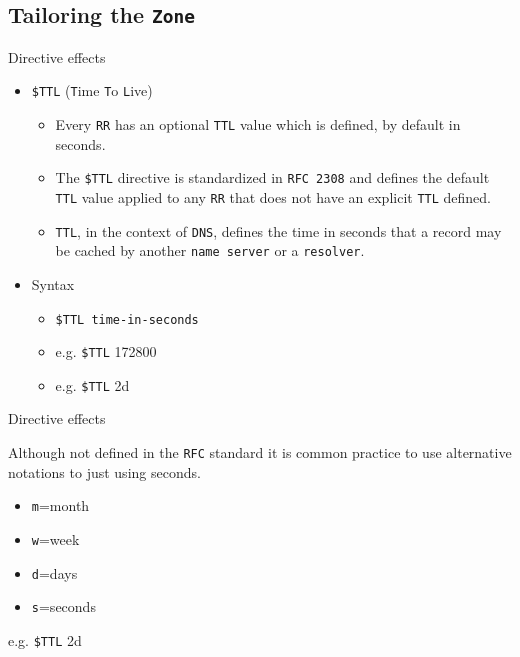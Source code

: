 \documentclass[xcolor=table]{beamer}
\begin{document}
\subsection{Tailoring the \texttt{Zone}}
\begin{frame}{Directive effects}
  \begin{itemize}
    \item \texttt{\$TTL} (\texttt{T}ime \texttt{T}o \texttt{L}ive)
       \begin{itemize}
          \item Every \texttt{RR} has an optional \texttt{TTL} value which is defined, by default in seconds.
          \item The \texttt{\$TTL} directive is standardized in \texttt{RFC 2308} and defines the default \texttt{TTL} value applied to any \texttt{RR} that does not have an explicit \texttt{TTL} defined. 
          \item \texttt{TTL}, in the context of \texttt{DNS}, defines the time in seconds that a record may be cached by another \texttt{name server} or a \texttt{resolver}.
       \end{itemize}
    \item Syntax
       \begin{itemize}
          \item \texttt{\$TTL time-in-seconds}
          \item e.g. \texttt{\$TTL} 172800
          \item e.g. \texttt{\$TTL} 2d
       \end{itemize}
  \end{itemize}
\end{frame}

\begin{frame}{Directive effects}
  \begin{tcolorbox}[title={\textbf{NOTE:}}]
    Although not defined in the \texttt{RFC} standard it is common practice to use alternative notations to just using seconds.
    \begin{itemize}
      \item \texttt{m}=month
      \item \texttt{w}=week
      \item \texttt{d}=days
      \item \texttt{s}=seconds
    \end{itemize}
    e.g. \texttt{\$TTL} 2d
  \end{tcolorbox}
\end{frame}
\end{document}
